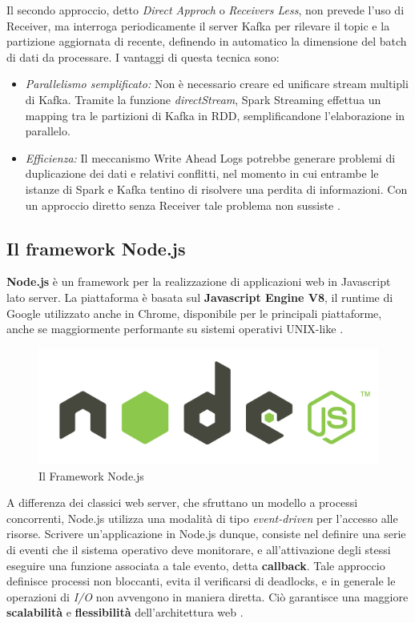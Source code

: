 \documentclass[12pt]{article}
\begin{document}
Il secondo approccio, detto \textit{Direct Approch} o \textit{Receivers Less}, non prevede l'uso di Receiver, ma interroga periodicamente il server Kafka per rilevare il topic e la partizione aggiornata di recente, definendo in automatico la dimensione del batch di dati da processare. I vantaggi di questa tecnica sono: 
\begin{itemize}
	\item \textit{Parallelismo semplificato: } Non è necessario creare ed unificare stream multipli di Kafka. Tramite la funzione \textit{directStream}, Spark Streaming effettua un mapping tra le partizioni di Kafka in RDD, semplificandone l'elaborazione in parallelo.
	\item \textit{Efficienza: } Il meccanismo Write Ahead Logs potrebbe generare problemi di duplicazione dei dati e relativi conflitti, nel momento in cui entrambe le istanze di Spark e Kafka tentino di risolvere una perdita di informazioni. Con un approccio diretto senza Receiver tale problema non sussiste \cite{spark}.
\end{itemize}

\subsection{Il framework Node.js}

\textbf{Node.js} è un framework per la realizzazione di applicazioni web in Javascript lato server. La piattaforma è basata sul \textbf{Javascript Engine V8}, il runtime di Google utilizzato anche in Chrome, disponibile per le principali piattaforme, anche se maggiormente performante su sistemi operativi UNIX-like \cite{nodejs}.

\begin{figure}[H]
	\centering
	\includegraphics[scale=0.50]{images/nodejs.png}
	\caption{Il Framework Node.js}
	\label{node}
\end{figure}

A differenza dei classici web server, che sfruttano un modello a processi concorrenti, Node.js utilizza una modalità di tipo \textit{event-driven} per l'accesso alle risorse. Scrivere un'applicazione in Node.js dunque, consiste nel definire una serie di eventi che il sistema operativo deve monitorare, e all'attivazione degli stessi eseguire una funzione associata a tale evento, detta \textbf{callback}. Tale approccio definisce processi non bloccanti, evita il verificarsi di deadlocks, e in generale le operazioni di \textit{I/O} non avvengono in maniera diretta. Ciò garantisce una maggiore \textbf{scalabilità} e \textbf{flessibilità} dell'architettura web \cite{nodejs}. \\
\end{document}
